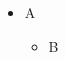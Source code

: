 \documentclass{article}
\begin{document}
\begin{itemize}\item A \the\itemsep\begin{itemize}\item B \the\itemsep\end{itemize}\end{itemize}
\end{document}
